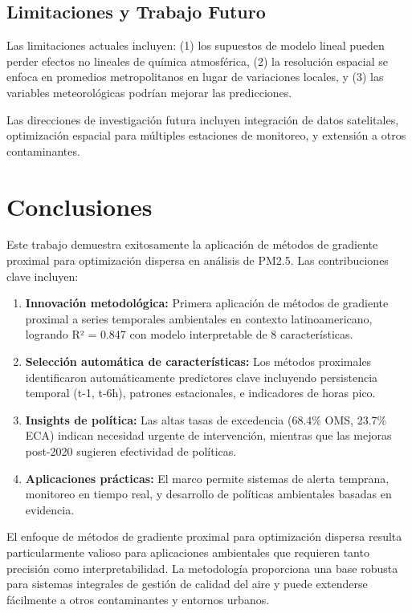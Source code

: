 \documentclass[conference]{IEEEtran}
\begin{document}
\subsection{Limitaciones y Trabajo Futuro}

Las limitaciones actuales incluyen: (1) los supuestos de modelo lineal pueden perder efectos no lineales de química atmosférica, (2) la resolución espacial se enfoca en promedios metropolitanos en lugar de variaciones locales, y (3) las variables meteorológicas podrían mejorar las predicciones.

Las direcciones de investigación futura incluyen integración de datos satelitales, optimización espacial para múltiples estaciones de monitoreo, y extensión a otros contaminantes.

\section{Conclusiones}

Este trabajo demuestra exitosamente la aplicación de métodos de gradiente proximal para optimización dispersa en análisis de PM2.5. Las contribuciones clave incluyen:

\begin{enumerate}
    \item \textbf{Innovación metodológica:} Primera aplicación de métodos de gradiente proximal a series temporales ambientales en contexto latinoamericano, logrando R² = 0.847 con modelo interpretable de 8 características.

    \item \textbf{Selección automática de características:} Los métodos proximales identificaron automáticamente predictores clave incluyendo persistencia temporal (t-1, t-6h), patrones estacionales, e indicadores de horas pico.

    \item \textbf{Insights de política:} Las altas tasas de excedencia (68.4\% OMS, 23.7\% ECA) indican necesidad urgente de intervención, mientras que las mejoras post-2020 sugieren efectividad de políticas.

    \item \textbf{Aplicaciones prácticas:} El marco permite sistemas de alerta temprana, monitoreo en tiempo real, y desarrollo de políticas ambientales basadas en evidencia.
\end{enumerate}

El enfoque de métodos de gradiente proximal para optimización dispersa resulta particularmente valioso para aplicaciones ambientales que requieren tanto precisión como interpretabilidad. La metodología proporciona una base robusta para sistemas integrales de gestión de calidad del aire y puede extenderse fácilmente a otros contaminantes y entornos urbanos.
\end{document}
